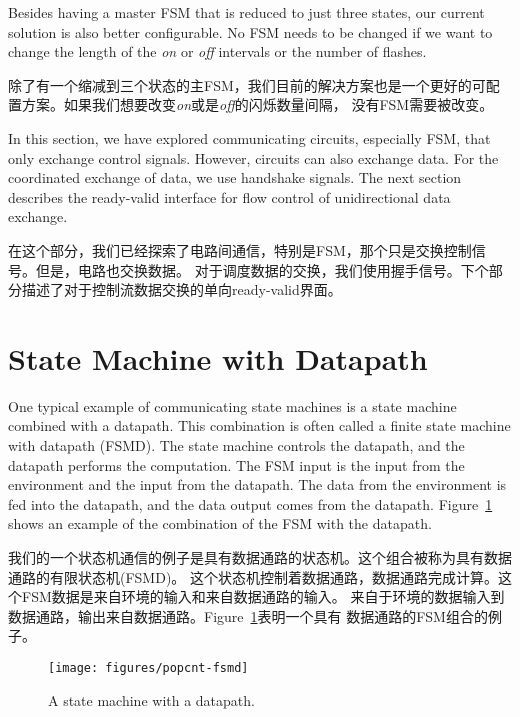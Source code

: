 \documentclass[%
    10pt,
    headinclude, footexclude,
    openright, %
    notitlepage,
    cleardoubleempty,
    headsepline,
    pointlessnumbers,
    bibtotoc, idxtotoc,
    ]{scrbook}
\newcommand{\scale}{0.7}
\begin{document}

Besides having a master FSM that is reduced to just three states, our current solution
is also better configurable. No FSM needs to be changed if we want to change
the length of the \emph{on} or \emph{off} intervals or the number of flashes.

除了有一个缩减到三个状态的主FSM，我们目前的解决方案也是一个更好的可配置方案。如果我们想要改变\emph{on}或是\emph{off}的闪烁数量间隔，
没有FSM需要被改变。

In this section, we have explored communicating circuits, especially FSM, that
only exchange control signals. However, circuits can also exchange data.
For the coordinated exchange of data, we use handshake signals.
The next section describes the ready-valid interface for flow control of
unidirectional data exchange.

在这个部分，我们已经探索了电路间通信，特别是FSM，那个只是交换控制信号。但是，电路也交换数据。
对于调度数据的交换，我们使用握手信号。下个部分描述了对于控制流数据交换的单向ready-valid界面。

\section{State Machine with Datapath}

One typical example of communicating state machines is a state machine
combined with a datapath. This combination is often called a finite state machine
with datapath (FSMD). The state machine controls the datapath, and the datapath
performs the computation. The FSM input is the input from the environment and the input
from the datapath. The data from the environment is fed into the datapath, and the
data output comes from the datapath. Figure~\ref{fig:popcnt-fsmd} shows an example
of the combination of the FSM with the datapath.

我们的一个状态机通信的例子是具有数据通路的状态机。这个组合被称为具有数据通路的有限状态机(FSMD)。
这个状态机控制着数据通路，数据通路完成计算。这个FSM数据是来自环境的输入和来自数据通路的输入。
来自于环境的数据输入到数据通路，输出来自数据通路。Figure~\ref{fig:popcnt-fsmd}表明一个具有
数据通路的FSM组合的例子。


\begin{figure}
  \centering
  \texttt{[image: figures/popcnt-fsmd]}
  \caption{A state machine with a datapath.}
  \label{fig:popcnt-fsmd}
\end{figure}
\end{document}
